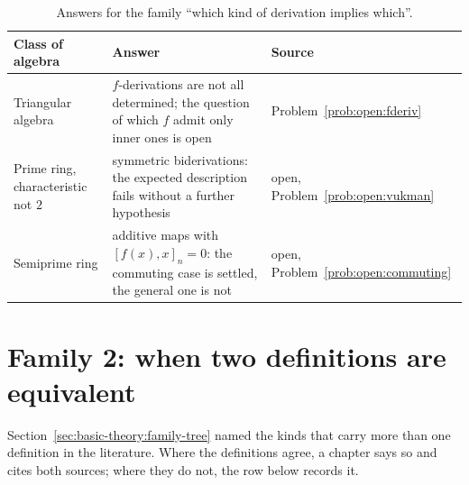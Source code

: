 \begin{table}[htbp]
  \centering
  \caption{Answers for the family ``which kind of derivation implies which''.}
  \label{tab:q:implications}
  \begin{tabular}{p{}p{}p{}}
    \toprule
    Class of algebra & Answer & Source \\ %
    \midrule
    Triangular algebra & $f$-derivations are not all determined; the %
      question of which $f$ admit only inner ones is open & %
      Problem~\ref{prob:open:fderiv} \\ %
    Prime ring, characteristic not $2$ & symmetric biderivations: the %
      expected description fails without a further hypothesis & open, %
      Problem~\ref{prob:open:vukman} \\ %
    Semiprime ring & additive maps with $[f(x),x]_n=0$: the commuting %
      case is settled, the general one is not & open, %
      Problem~\ref{prob:open:commuting} \\ %
    \bottomrule
  \end{tabular}
\end{table}

\section{Family 2: when two definitions are equivalent}

Section~\ref{sec:basic-theory:family-tree} named the kinds that carry more than %
one definition in the literature. %
Where the definitions agree, a chapter says so and cites both sources; where %
they do not, the row below records it. %

